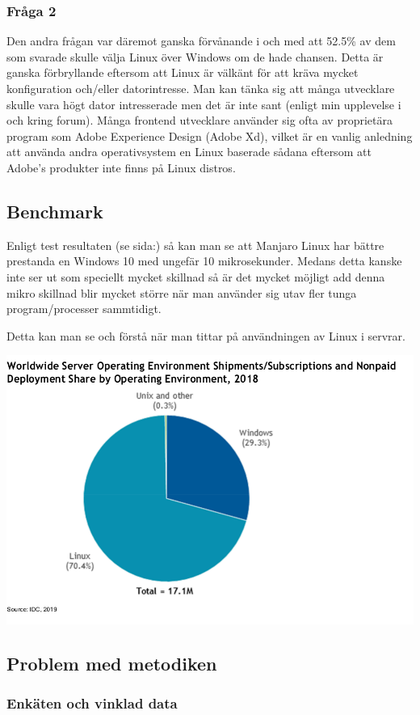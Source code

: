 \documentclass[12pt, a4paper]{report}
\begin{document}
\subsubsection{Fråga 2}
Den andra frågan var däremot ganska förvånande i och med att 52.5\% av dem som svarade skulle välja Linux över Windows om de hade chansen. Detta är ganska förbryllande eftersom att Linux är välkänt för att kräva mycket konfiguration och/eller datorintresse. Man kan tänka sig att många utvecklare skulle vara högt dator intresserade men det är inte sant (enligt min upplevelse i och kring forum). Många frontend utvecklare använder sig ofta av proprietära program som Adobe Experience Design (Adobe Xd), vilket är en vanlig anledning att använda andra operativsystem en Linux baserade sådana eftersom att Adobe's produkter inte finns på Linux distros. 


\subsection{Benchmark}

Enligt test resultaten (se sida:\pageref{tests}) så kan man se att Manjaro Linux har bättre prestanda en Windows 10 med ungefär 10 mikrosekunder. Medans detta kanske inte ser ut som speciellt mycket skillnad så är det mycket möjligt add denna mikro skillnad blir mycket större när man använder sig utav fler tunga program/processer sammtidigt.

Detta kan man se och förstå när man tittar på användningen av Linux i servrar.

\vspace{1cm}
\includegraphics[width=.6\textwidth]{IDC.png}\cite{linux-market}


\subsection{Problem med metodiken}

\subsubsection{Enkäten och vinklad data}
\end{document}
